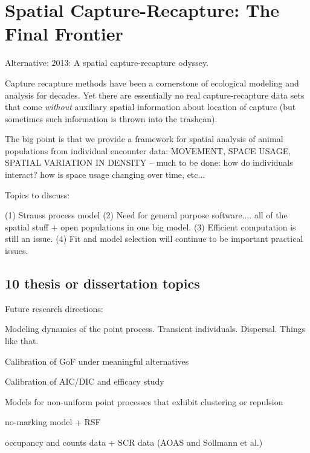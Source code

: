 


\chapter{Spatial Capture-Recapture: The Final Frontier}

\label{chapt.final}

\vspace{0.3cm}

Alternative: 2013: A spatial capture-recapture odyssey. 

\vspace{2in}

Capture recapture methods have been a cornerstone of ecological
modeling and analysis for decades.  Yet there are essentially no real
capture-recapture data sets that come {\it without} auxiliary spatial
information about location of capture (but sometimes such information
is thrown into the trashcan). 

The big point is that we provide a framework for spatial analysis of animal populations from
individual encounter data:
MOVEMENT, SPACE USAGE, SPATIAL VARIATION IN DENSITY -- 
much to be done: how do individuals interact? how is space usage changing over time, etc...


Topics to discuss:

 (1) Strauss process model
 (2) Need for general purpose software.... all of the spatial stuff + 
open populations in one big model. 
 (3) Efficient computation is still an issue.
 (4) Fit and model selection will continue to be important practical
 issues.

\section{10 thesis or dissertation topics}

Future research directions:

 Modeling dynamics of the point process. Transient individuals. 
 Dispersal. Things like that.

Calibration of GoF under meaningful alternatives

Calibration of AIC/DIC and efficacy study

Models for non-uniform point processes that exhibit clustering or
repulsion


no-marking model + RSF

occupancy and counts data + SCR data (AOAS and Sollmann et al.)






